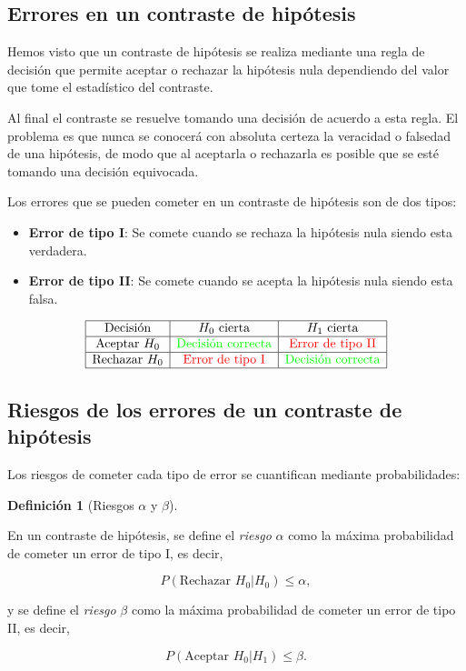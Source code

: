 \documentclass[
  a4paper,
]{scrreport}
\theoremstyle{plain}
\theoremstyle{definition}
\newtheorem{definition}{Definición}[chapter]
\theoremstyle{definition}
\theoremstyle{remark}
\begin{document}
\subsection{Errores en un contraste de
hipótesis}\label{errores-en-un-contraste-de-hipuxf3tesis}

Hemos visto que un contraste de hipótesis se realiza mediante una regla
de decisión que permite aceptar o rechazar la hipótesis nula dependiendo
del valor que tome el estadístico del contraste.

Al final el contraste se resuelve tomando una decisión de acuerdo a esta
regla. El problema es que nunca se conocerá con absoluta certeza la
veracidad o falsedad de una hipótesis, de modo que al aceptarla o
rechazarla es posible que se esté tomando una decisión equivocada.

Los errores que se pueden cometer en un contraste de hipótesis son de
dos tipos:

\begin{itemize}
\item
  \textbf{Error de tipo I}: Se comete cuando se rechaza la hipótesis
  nula siendo esta verdadera.
\item
  \textbf{Error de tipo II}: Se comete cuando se acepta la hipótesis
  nula siendo esta falsa.
\end{itemize}

\[
\begin{array}{|c|c|c|}
\hline
\mbox{Decisión} & H_0 \mbox{ cierta} & H_1 \mbox{ cierta} \\
\hline
\mbox{Aceptar } H_0 & \color{green}{\mbox{Decisión correcta}} & \color{red}{\mbox{Error de tipo II}} \\
\hline
\mbox{Rechazar }H_0 & \color{red}{\mbox{Error de tipo I}} & \color{green}{\mbox{Decisión correcta}} \\
\hline
\end{array}
\]

\subsection{Riesgos de los errores de un contraste de
hipótesis}\label{riesgos-de-los-errores-de-un-contraste-de-hipuxf3tesis}

Los riesgos de cometer cada tipo de error se cuantifican mediante
probabilidades:

\begin{definition}[Riesgos \(\alpha\) y
\(\beta\)]\protect\hypertarget{def-riesgos-alfa-beta}{}\label{def-riesgos-alfa-beta}

En un contraste de hipótesis, se define el \emph{riesgo} \(\alpha\) como
la máxima probabilidad de cometer un error de tipo I, es decir,

\[
P(\mbox{Rechazar }H_0|H_0) \leq \alpha,
\]

y se define el \emph{riesgo} \(\beta\) como la máxima probabilidad de
cometer un error de tipo II, es decir,

\[
P(\mbox{Aceptar }H_0|H_1) \leq \beta.
\]

\end{definition}
\end{document}

